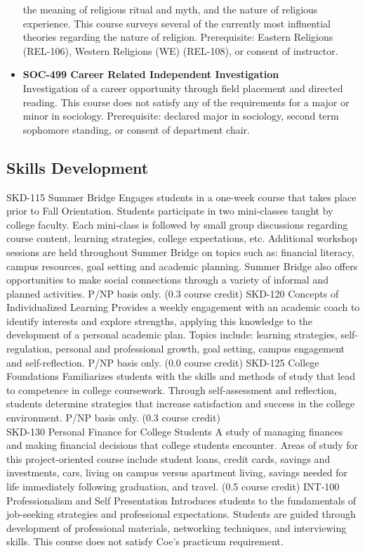 \documentclass[
  letterpaper,
]{scrbook}
\begin{document}
\begin{itemize}
  the meaning of religious ritual and myth, and the nature of religious
  experience. This course surveys several of the currently most
  influential theories regarding the nature of religion. Prerequisite:
  Eastern Religions (REL-106), Western Religions (WE) (REL-108), or
  consent of instructor.
\item
  \textbf{SOC-499 Career Related Independent Investigation}\\
  Investigation of a career opportunity through field placement and
  directed reading. This course does not satisfy any of the requirements
  for a major or minor in sociology. Prerequisite: declared major in
  sociology, second term sophomore standing, or consent of department
  chair.
\end{itemize}

\subsection{Skills
Development}\label{sec-academic-programs-skills-development}

SKD-115 Summer Bridge Engages students in a one-week course that takes
place prior to Fall Orientation. Students participate in two
mini-classes taught by college faculty. Each mini-class is followed by
small group discussions regarding course content, learning strategies,
college expectations, etc. Additional workshop sessions are held
throughout Summer Bridge on topics such as: financial literacy, campus
resources, goal setting and academic planning. Summer Bridge also offers
opportunities to make social connections through a variety of informal
and planned activities. P/NP basis only. (0.3 course credit) SKD-120
Concepts of Individualized Learning Provides a weekly engagement with an
academic coach to identify interests and explore strengths, applying
this knowledge to the development of a personal academic plan. Topics
include: learning strategies, self-regulation, personal and professional
growth, goal setting, campus engagement and self-reflection. P/NP basis
only. (0.0 course credit) SKD-125 College Foundations Familiarizes
students with the skills and methods of study that lead to competence in
college coursework. Through self-assessment and reflection, students
determine strategies that increase satisfaction and success in the
college environment. P/NP basis only. (0.3 course credit)\\
SKD-130 Personal Finance for College Students A study of managing
finances and making financial decisions that college students encounter.
Areas of study for this project-oriented course include student loans,
credit cards, savings and investments, cars, living on campus versus
apartment living, savings needed for life immediately following
graduation, and travel. (0.5 course credit) INT-100 Professionalism and
Self Presentation Introduces students to the fundamentals of job-seeking
strategies and professional expectations. Students are guided through
development of professional materials, networking techniques, and
interviewing skills. This course does not satisfy Coe's practicum
requirement.
\end{document}
